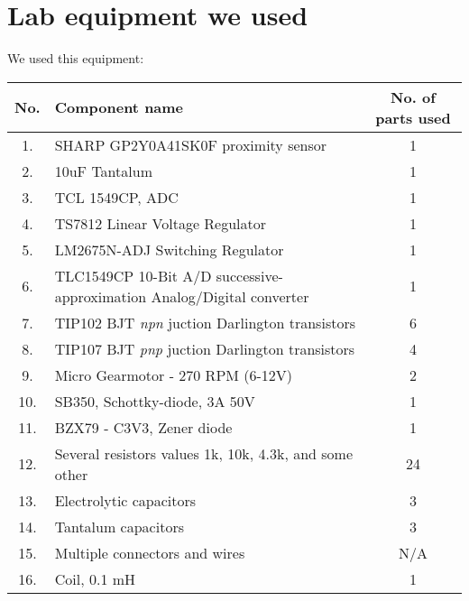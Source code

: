 \section{Lab equipment we used}
We used this equipment:

\begin{tabular}{|c|l|c|}
  \hline
 No. & Component name & No. of parts used \\
    \hline
      \hline
  1. & SHARP GP2Y0A41SK0F proximity sensor & 1 \\ 
  \hline
  2. & 10uF Tantalum& 1 \\ 
  \hline
  3. & TCL 1549CP, ADC& 1 \\ 
  \hline
   4. & TS7812 Linear Voltage Regulator& 1 \\ 
     \hline
  5. & LM2675N-ADJ Switching Regulator & 1 \\ 
    \hline
  6. & TLC1549CP 10-Bit A/D  successive-approximation Analog/Digital converter & 1 \\ 
    \hline
  7. & TIP102 BJT \emph{npn} juction Darlington transistors & 6 \\
    \hline
  8. & TIP107 BJT \emph{pnp} juction Darlington transistors & 4 \\ 
    \hline
  9. & Micro Gearmotor - 270 RPM (6-12V) & 2 \\
    \hline
    
  10. & SB350, Schottky-diode, 3A 50V & 1\\
    \hline
  11. & BZX79 - C3V3, Zener diode& 1\\
    \hline	      
  12. & Several resistors values 1k, 10k, 4.3k, and some other & 24\\
   \hline 
  13. & Electrolytic capacitors & 3\\
   \hline  
  14. & Tantalum capacitors & 3\\
   \hline   
  15. & Multiple connectors and wires & N/A \\
   \hline      
  16. & Coil, 0.1 mH & 1 \\
   \hline       
      
\end{tabular}

